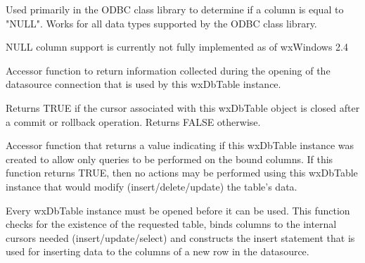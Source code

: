 \label{wxdbtableiscolnull}


Used primarily in the ODBC class library to determine if a column is equal 
to "NULL".  Works for all data types supported by the ODBC class library.




NULL column support is currently not fully implemented as of wxWindows 2.4


\label{wxdbtableiscursorclosedoncommit}


Accessor function to return information collected during the opening of the 
datasource connection that is used by this wxDbTable instance.


Returns TRUE if the cursor associated with this wxDbTable object is closed 
after a commit or rollback operation.  Returns FALSE otherwise.


\label{wxdbtableisqueryonly}


Accessor function that returns a value indicating if this wxDbTable instance 
was created to allow only queries to be performed on the bound columns.  If 
this function returns TRUE, then no actions may be performed using this 
wxDbTable instance that would modify (insert/delete/update) the table's data.


\label{wxdbtableopen}


Every wxDbTable instance must be opened before it can be used.  This function 
checks for the existence of the requested table, binds columns to the 
internal cursors needed (insert/update/select) and constructs the insert 
statement that is used for inserting data to the columns of a new row in 
the datasource.


